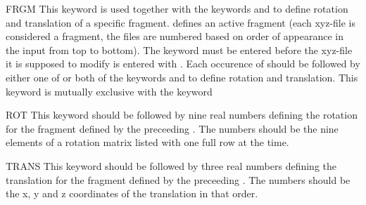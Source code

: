\begin{keywordlist}
\item[FRGM]
This keyword is used together with the keywords  and  to define
rotation and translation of a specific fragment.  defines an active fragment (each xyz-file is considered a fragment, the files are numbered based on
order of appearance in the input from top to bottom). The keyword must be entered before the xyz-file it is supposed to modify is
entered with . Each occurence of
 should be followed by either one of or both of the keywords  and 
to define rotation and translation. This keyword is mutually exclusive with the keyword 


\item[ROT]
This keyword should be followed by nine real numbers defining the rotation for the fragment defined by
the preceeding . The numbers should be the nine elements of a rotation matrix
listed with one full row at the time.

\item[TRANS]
This keyword should be followed by three real numbers defining the translation for the fragment defined
by the preceeding . The numbers should be the x, y and z coordinates of the translation
in that order.


\end{keywordlist}

